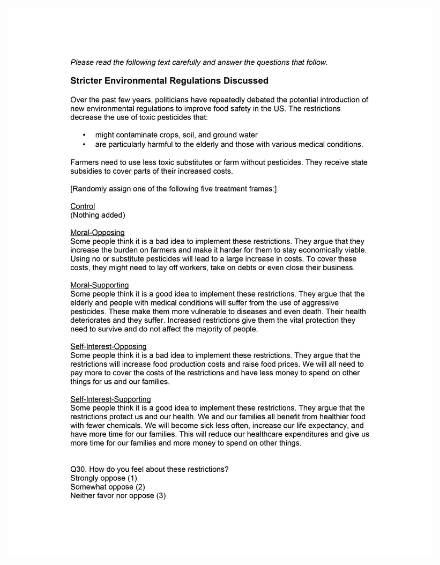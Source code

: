 \documentclass[12pt,econ]{sources/authesis}
\makeatletter
\def\maxwidth{\ifdim\Gin@nat@width>\linewidth\linewidth
\else\Gin@nat@width\fi}
\let\Oldincludegraphics\includegraphics
\renewcommand{\includegraphics}[1]{\Oldincludegraphics[width=\maxwidth]{#1}}
\makeatother
\begin{document}
\begin{figure}[hbt]
  \centering
\includegraphics{data/framing/appendix/questionnaire/questionnaire18.jpg}
\end{figure}
\end{document}
